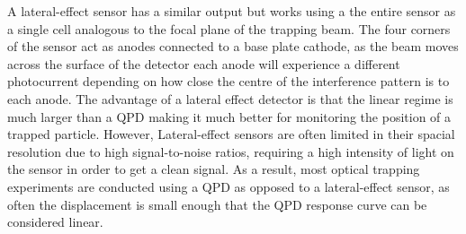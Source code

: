 A lateral-effect sensor has a similar output but works using a 
the entire sensor as a single cell analogous to the focal plane of
the trapping beam. The four corners of the sensor act as anodes 
connected to a base plate cathode, as the beam moves across the
surface of the detector each anode will experience a different 
photocurrent depending on how close the centre of the 
interference pattern is to each anode. The advantage of a 
lateral effect detector is that the linear regime is much larger 
than a QPD making it much better for monitoring the position of a
trapped particle. However, Lateral-effect sensors are often limited
in their spacial resolution due to high signal-to-noise ratios, 
requiring a high intensity of light on the sensor in order to 
get a clean signal. As a result, most optical trapping experiments
are conducted using a QPD as opposed to a lateral-effect sensor, 
as often the displacement is small enough that the QPD response 
curve can be considered linear.

